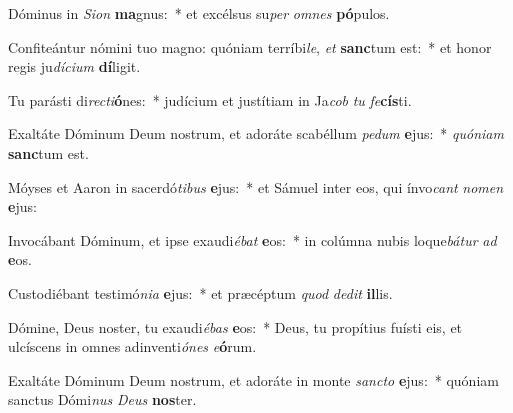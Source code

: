 \item Dóminus in \textit{Si}\textit{on} \textbf{ma}gnus:~* et excélsus su\textit{per} \textit{om}\textit{nes} \textbf{pó}pulos.
\item Confiteántur nómini tuo magno: quóniam terríbi\textit{le}, \textit{et} \textbf{sanc}tum est:~* et honor regis ju\textit{dí}\textit{ci}\textit{um} \textbf{dí}ligit.
\item Tu parásti di\textit{rec}\textit{ti}\textbf{ó}nes:~* judícium et justítiam in Ja\textit{cob} \textit{tu} \textit{fe}\textbf{cís}ti.
\item Exaltáte Dóminum Deum nostrum, et adoráte scabéllum \textit{pe}\textit{dum} \textbf{e}jus:~* \textit{quón}\textit{i}\textit{am} \textbf{sanc}tum est.
\item Móyses et Aaron in sacerdó\textit{ti}\textit{bus} \textbf{e}jus:~* et Sámuel inter eos, qui ínvo\textit{cant} \textit{no}\textit{men} \textbf{e}jus:
\item Invocábant Dóminum, et ipse exaudi\textit{é}\textit{bat} \textbf{e}os:~* in colúmna nubis loque\textit{bá}\textit{tur} \textit{ad} \textbf{e}os.
\item Custodiébant testimó\textit{ni}\textit{a} \textbf{e}jus:~* et præcéptum \textit{quod} \textit{de}\textit{dit} \textbf{il}lis.
\item Dómine, Deus noster, tu exaudi\textit{é}\textit{bas} \textbf{e}os:~* Deus, tu propítius fuísti eis, et ulcíscens in omnes adinventi\textit{ó}\textit{nes} \textit{e}\textbf{ó}rum.
\item Exaltáte Dóminum Deum nostrum, et adoráte in monte \textit{sanc}\textit{to} \textbf{e}jus:~* quóniam sanctus Dómi\textit{nus} \textit{De}\textit{us} \textbf{nos}ter.
